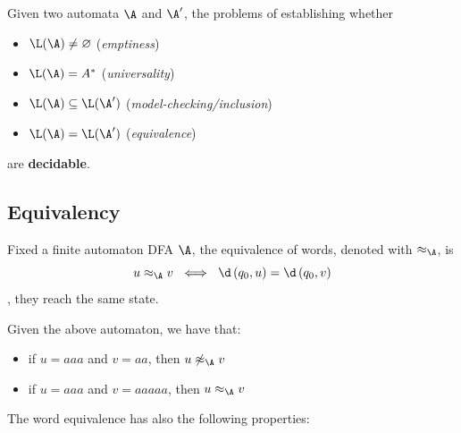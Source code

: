 \documentclass[oneside]{academica}
\begin{document}
\begin{theorem*}
  Given two automata $\A$ and $\A'$, the problems of establishing whether
  \begin{itemize}
    \item $\L(\A) \neq \emptyset$ \hspace{41pt} (\textit{emptiness})
    \item $\L(\A) = A^*$ \hspace{38pt} (\textit{universality})
    \item $\L(\A) \subseteq \L(\A')$ \hspace{20pt} (\textit{model-checking/inclusion})
    \item $\L(\A) = \L(\A')$ \hspace{20pt} (\textit{equivalence})
  \end{itemize}
  are \textbf{decidable}.
\end{theorem*}

\subsection{Equivalency}

\begin{definition}\label{def:word_eq}
  Fixed a finite automaton DFA $\A$, the equivalence of words, denoted with $\approx_{\A}$, is
  \begin{equation*}
    u \approx_{\A} v \ \iff \ \d\left( q_0,u \right) = \d\left( q_0,v \right)
  \end{equation*}
  \ie, they reach the same state.
\end{definition}

\begin{example*}
  \begin{center}
    
  \end{center}
  Given the above automaton, we have that:
  \begin{itemize}
    \item if $u = aaa$ and $v = aa$, then $u \not\approx_{\A} v$
    \item if $u = aaa$ and $v = aaaaa$, then $u \approx_{\A} v$
  \end{itemize}
\end{example*}

The word equivalence has also the following properties:
\end{document}
